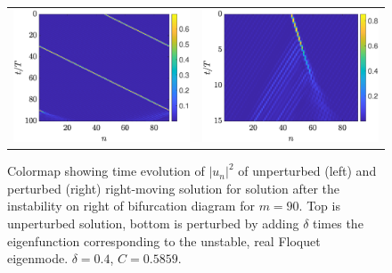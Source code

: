 \documentclass{article}
\begin{document}
\begin{figure}[H]
    \centering
    \begin{tabular}{cc}
    \includegraphics[width=7cm]{rightafterinstabilityRtimestep} &
    \includegraphics[width=7cm]{rightafterinstabilityRperttimestep}
    \end{tabular}
    \caption{Colormap showing time evolution of $|u_n|^2$ of unperturbed (left) and perturbed (right) right-moving solution for solution after the instability on right of bifurcation diagram for $m=90$. Top is unperturbed solution, bottom is perturbed by adding $\delta$ times the eigenfunction corresponding to the unstable, real Floquet eigenmode. $\delta = 0.4$, $C=0.5859$. }
    \label{fig:rightinstabRpert}
\end{figure}
\end{document}
